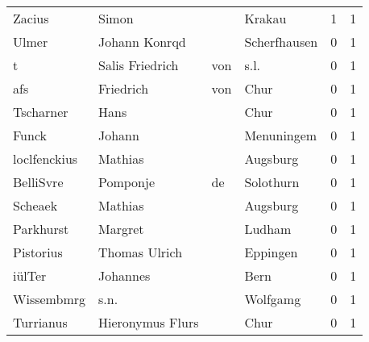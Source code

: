 \begin{center}
\begin{tiny}
\begin{longtabu}{llllrr}
                   Zacius &                              Simon &             &                                      Krakau &          1 &         1 \\
                    Ulmer &                      Johann Konrqd &             &                                Scherfhausen &          0 &         1 \\
                        t &                    Salis Friedrich &         von &                                        s.l. &          0 &         1 \\
                      afs &                          Friedrich &         von &                                        Chur &          0 &         1 \\
                Tscharner &                               Hans &             &                                        Chur &          0 &         1 \\
                    Funck &                             Johann &             &                                  Menuningem &          0 &         1 \\
             loclfenckius &                            Mathias &             &                                    Augsburg &          0 &         1 \\
                BelliSvre &                           Pomponje &          de &                                   Solothurn &          0 &         1 \\
                  Scheaek &                            Mathias &             &                                    Augsburg &          0 &         1 \\
                Parkhurst &                            Margret &             &                                      Ludham &          0 &         1 \\
                Pistorius &                      Thomas Ulrich &             &                                    Eppingen &          0 &         1 \\
                   iülTer &                           Johannes &             &                                        Bern &          0 &         1 \\
               Wissembmrg &                               s.n. &             &                                    Wolfgamg &          0 &         1 \\
                Turrianus &                   Hieronymus Flurs &             &                                        Chur &          0 &         1 \\

\end{longtabu}
\end{tiny}
\end{center}
